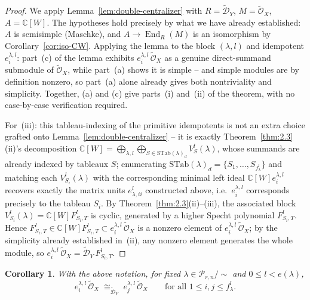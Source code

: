 \documentclass[11pt,a4paper]{article}
\newtheorem{corollary}[theorem]{Corollary}
\begin{document}
\begin{proof}
We apply Lemma~\ref{lem:double-centralizer} with $R = \widetilde{\mathcal D}_Y$,
$M = \widetilde{\mathcal O}_X$, $A = \mathbb{C}[W]$. The hypotheses hold
precisely by what we have already established: $A$ is semisimple
(Maschke), and $A \to \operatorname{End}_R(M)$ is an isomorphism by
Corollary~\ref{cor:iso-CW}. Applying the lemma to the block
$(\lambda,l)$ and idempotent $e^{\lambda,l}_i$: part~(c) of the lemma
exhibits $e^{\lambda,l}_i\,\widetilde{\mathcal{O}}_X$ as a genuine
direct-summand submodule of $\widetilde{\mathcal{O}}_X$, while
part~(a) shows it is simple -- and simple modules are by definition
nonzero, so part~(a) alone already gives both nontriviality and
simplicity. Together, (a) and (c) give parts~(i) and~(ii) of the
theorem, with no case-by-case verification required.

For~(iii): this tableau-indexing of the primitive idempotents is not
an extra choice grafted onto Lemma~\ref{lem:double-centralizer} -- it
is exactly Theorem~\ref{thm:2.3}(ii)'s decomposition
$\mathbb{C}[W] = \bigoplus_{\lambda,l} \bigoplus_{S \in \mathrm{STab}(\lambda)_d} V^l_S(\lambda)$,
whose summands are already indexed by tableaux $S$; enumerating
$\mathrm{STab}(\lambda)_d = \{S_1,\dots,S_{f^l_\lambda}\}$ and matching
each $V^l_{S_i}(\lambda)$ with the corresponding minimal left ideal
$\mathbb{C}[W]e^{\lambda,l}_i$ recovers exactly the matrix units
$e^l_{\lambda,ii}$ constructed above, i.e.\ $e^{\lambda,l}_i$
corresponds precisely to the tableau $S_i$. By
Theorem~\ref{thm:2.3}(ii)--(iii), the associated block
$V^l_{S_i}(\lambda) = \mathbb{C}[W]F^l_{S_i,T}$ is cyclic, generated by
a higher Specht polynomial $F^l_{S_i,T}$. Hence
$F^l_{S_i,T} \in \mathbb{C}[W]F^l_{S_i,T} \subset e^{\lambda,l}_i\,\widetilde{\mathcal O}_X$
is a nonzero element of $e^{\lambda,l}_i\,\widetilde{\mathcal O}_X$; by
the simplicity already established in~(ii), any nonzero element
generates the whole module, so
$e^{\lambda,l}_i\,\widetilde{\mathcal O}_X = \widetilde{\mathcal D}_Y\, F^l_{S_i,T}$.
\end{proof}

\begin{corollary}\label{cor:iso-simple}
With the above notation, for fixed $\lambda \in \mathcal{P}_{r,n}/\sim$
and $0 \le l < e(\lambda)$,
\[
  e^{\lambda,l}_i\,\widetilde{\mathcal{O}}_X \;\cong_{\widetilde{\mathcal{D}}_Y}\;
  e^{\lambda,l}_j\,\widetilde{\mathcal{O}}_X
  \qquad \text{for all } 1 \le i,j \le f^l_\lambda.
\]
\end{corollary}
\end{document}
